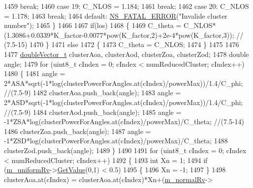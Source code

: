 \begin{DoxyCode}
1459                                  \textcolor{keywordflow}{break};
1460                 \textcolor{keywordflow}{case} 19: C\_NLOS = 1.184;
1461                                  \textcolor{keywordflow}{break};
1462                 \textcolor{keywordflow}{case} 20: C\_NLOS = 1.178;
1463                                  \textcolor{keywordflow}{break};
1464                 \textcolor{keywordflow}{default}: \hyperlink{group__fatal_ga5131d5e3f75d7d4cbfd706ac456fdc85}{NS\_FATAL\_ERROR}(\textcolor{stringliteral}{"Invalide cluster number"});
1465         \}
1466 
1467         \textcolor{keywordflow}{if}(los)
1468         \{
1469                 C\_theta = C\_NLOS*(1.3086+0.0339*K\_factor-0.0077*pow(K\_factor,2)+2e-4*pow(K\_factor,3)); \textcolor{comment}{//
      (7.5-15)}
1470         \}
1471         \textcolor{keywordflow}{else}
1472         \{
1473                 C\_theta = C\_NLOS;
1474         \}
1475 
1476 
1477         \hyperlink{namespacens3_aa6f1edf6566ca6afec613bc6e40240ea}{doubleVector\_t} clusterAoa, clusterAod, clusterZoa, clusterZod;
1478         \textcolor{keywordtype}{double} angle;
1479         \textcolor{keywordflow}{for} (uint8\_t cIndex = 0; cIndex < numReducedCluster; cIndex++)
1480         \{
1481                 angle = 2*ASA*sqrt(-1*log(clusterPowerForAngles.at(cIndex)/powerMax))/1.4/C\_phi; \textcolor{comment}{//(7.5-9)}
1482                 clusterAoa.push\_back(angle);
1483                 angle = 2*ASD*sqrt(-1*log(clusterPowerForAngles.at(cIndex)/powerMax))/1.4/C\_phi; \textcolor{comment}{//(7.5-9)}
1484                 clusterAod.push\_back(angle);
1485                 angle = -1*ZSA*log(clusterPowerForAngles.at(cIndex)/powerMax)/C\_theta; \textcolor{comment}{//(7.5-14)}
1486                 clusterZoa.push\_back(angle);
1487                 angle = -1*ZSD*log(clusterPowerForAngles.at(cIndex)/powerMax)/C\_theta;
1488                 clusterZod.push\_back(angle);
1489         \}
1490 
1491         \textcolor{keywordflow}{for} (uint8\_t cIndex = 0; cIndex < numReducedCluster; cIndex++)
1492         \{
1493                 \textcolor{keywordtype}{int} Xn = 1;
1494                 \textcolor{keywordflow}{if} (\hyperlink{classns3_1_1MmWave3gppChannel_ac6493e4d80b717378e74a63d418f8c6f}{m\_uniformRv}->\hyperlink{classns3_1_1UniformRandomVariable_a03822d8c86ac51e9aa83bbc73041386b}{GetValue}(0,1) < 0.5)
1495                 \{
1496                         Xn = -1;
1497                 \}
1498                 clusterAoa.at(cIndex) = clusterAoa.at(cIndex)*Xn+(\hyperlink{classns3_1_1MmWave3gppChannel_ac2e02ebacc72ed96518d785f2dc87c57}{m\_normalRv}->

\end{DoxyCode}
